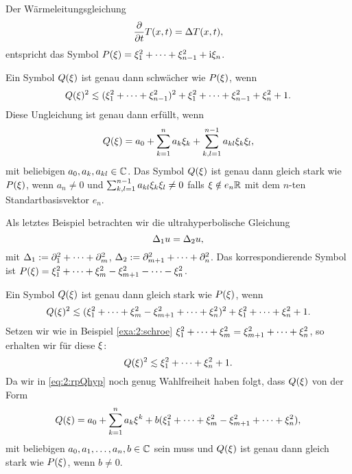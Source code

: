 \begin{exa}\label{exa:2:heat}
Der Wärmeleitungsgleichung
\begin{equation}
\frac{\partial}{\partial t}T(x,t)=\Delta T(x,t),
\end{equation}
entspricht das Symbol $P(\xi)=\xi^2_1+\dots+\xi^2_{n-1}+\mathrm i\xi_n$.

Ein Symbol $Q(\xi)$ ist genau dann schwächer wie $P(\xi)$, wenn
\begin{equation}
Q(\x)^2\apprle(\x^2_1+\dots+\x^2_{n-1})^2+\x^2_1+\dots+\x^2_{n-1}+\x^2_n+1.
\end{equation}
Diese Ungleichung ist genau dann erfüllt, wenn
\begin{equation}
Q(\xi)=a_0+\sum_{k=1}^na_k\xi_k+\sum_{k,l=1}^{n-1}a_{kl}\xi_k\xi_l,
\end{equation}
mit beliebigen $a_0,a_k,a_{kl}\in\mathbb C$.
Das Symbol $Q(\xi)$ ist genau dann gleich stark wie $P(\xi)$,
wenn $a_n\neq0$ und $\sum_{k,l=1}^{n-1}a_{kl}\xi_k\xi_l\neq0$ falls $\xi\notin e_n\mathbb R$
mit dem $n$-ten Standartbasisvektor $e_n$.
\end{exa}

\begin{exa}\label{exa:2:hyper}
Als letztes Beispiel betrachten wir die ultrahyperbolische Gleichung
\begin{equation}
\Delta_1u=\Delta_2u,
\end{equation}
mit $\Delta_1:=\partial_1^2+\dots+\partial_m^2$, $\Delta_2:=\partial^2_{m+1}+\dots+\partial^2_n$.
Das korrespondierende Symbol ist $P(\xi)=\xi^2_1+\dots+\xi^2_m-\xi^2_{m+1}-\dots-\xi^2_n$.

Ein Symbol $Q(\xi)$ ist genau dann gleich stark wie $P(\xi)$,
wenn
\begin{equation}
Q(\x)^2\apprle(\x^2_1+\dots+\x^2_m-\x^2_{m+1}+\dots+\x^2_n)^2+\x^2_1+\dots+\x^2_n+1.
\end{equation}
Setzen wir wie in Beispiel \ref{exa:2:schroe} $\xi^2_1+\dots+\xi^2_m=\xi^2_{m+1}+\dots+\xi^2_n$,
so erhalten wir für diese $\xi$:
\begin{equation}\label{eq:2:rpQhyp}
Q(\x)^2\apprle\x^2_1+\dots+\x^2_n+1.
\end{equation}
Da wir in \eqref{eq:2:rpQhyp} noch genug Wahlfreiheit haben folgt,
dass $Q(\xi)$ von der Form
\begin{equation}
Q(\xi)=a_0+\sum_{k=1}^na_k\xi^k+b(\xi_1^2+\dots+\xi^2_m-\xi^2_{m+1}+\dots+\xi^2_n),
\end{equation}
mit beliebigen $a_0,a_1,\dots,a_n,b\in\mathbb C$ sein muss
und $Q(\xi)$ ist genau dann gleich stark wie $P(\xi)$,
wenn $b\neq0$.
\end{exa}

